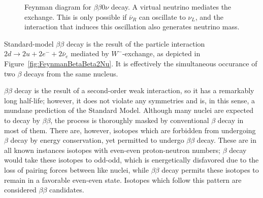 \begin{figure}
\begin{center}
\end{center}
\caption{Feynman diagram for $\beta\beta 0 \nu$ decay.  A virtual neutrino mediates the exchange.  This is only possible if $\overline{\nu}_R$ can oscillate to $\nu_L$, and the interaction that induces this oscillation also generates neutrino mass.}
\label{fig:FeynmanBetaBeta0Nu}
\end{figure}

Standard-model $\beta\beta$ decay is the result of the particle interaction $2d \rightarrow 2u + 2e^- + 2\bar{\nu}_e$ mediated by $W^-$-exchange, as depicted in Figure~\ref{fig:FeynmanBetaBeta2Nu}.  It is effectively the simultaneous occurance of two $\beta$ decays from the same nucleus.

$\beta\beta$ decay is the result of a second-order weak interaction, so it has a remarkably long half-life; however, it does not violate any symmetries and is, in this sense, a mundane prediction of the Standard Model.  Although many nuclei are expected to decay by $\beta\beta$, the process is thoroughly masked by conventional $\beta$ decay in most of them.  There are, however, isotopes which are forbidden from undergoing $\beta$ decay by energy conservation, yet permitted to undergo $\beta\beta$ decay.  These are in all known instances isotopes with even-even proton-neutron numbers; $\beta$ decay would take these isotopes to odd-odd, which is energetically disfavored due to the loss of pairing forces between like nuclei, while $\beta\beta$ decay permits these isotopes to remain in a favorable even-even state.  Isotopes which follow this pattern are considered $\beta\beta$ candidates.

